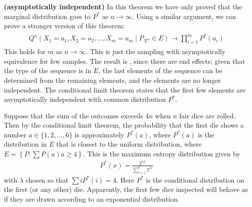\documentclass{article}
\newcommand{\bfs}[1]{\textbf{({#1})}}
\begin{document}
\begin{rema}{\bfs{asymptotically independent}}\label{clt:rema4}
In this theorem we have only proved that the marginal distribution goes
to $P^{*}$ as $n \rightarrow \infty$. Using a similar argument, we can prove a stronger version of this theorem:
\begin{align*}
\begin{aligned}
Q^n\left(X_{1}=a_{1}, X_{2}=a_{2}, \ldots, X_{m} =a_{m} \mid P_{X^{n}} \in E\right) \rightarrow \prod_{i=1}^{m} P^{*}\left(a_{i}\right)
\end{aligned}
\end{align*}
This holds for  $m$ as $n \rightarrow \infty$. This is just the sampling  with asymptotically equivalence for few samples. The result is , since there are end effects; given that the type of the sequence is in $E$, the last elements of the sequence can be determined from the remaining elements, and the elements are no longer independent. The conditional limit theorem states that the first few elements are asymptotically independent with common distribution $P^{*}$.
\end{rema}



\begin{exma}
Suppose that the sum of the outcomes exceeds $4 n$ when $n$ fair dice are rolled. Then by the conditional limit theorem, the probability that the first die shows a number $a \in\{1,2, \ldots, 6\}$ is approximately $P^{*}(a)$, where $P^{*}(a)$ is the distribution in $E$ that is closest to the uniform distribution, where $E=\left\{P: \sum P(a) a \geq 4\right\} .$ This is the maximum entropy distribution given by
\begin{align*}
P^{*}(x)=\frac{2^{\lambda x}}{\sum_{i=1}^{6} 2^{\lambda i}}
\end{align*}
with $\lambda$ chosen so that $\sum i P^{*}(i)=4$. Here $P^{*}$ is the conditional distribution on the first (or any other) die. Apparently, the first few dice inspected will behave as if they are drawn  according to an exponential distribution.
\end{exma} 
\end{document}

